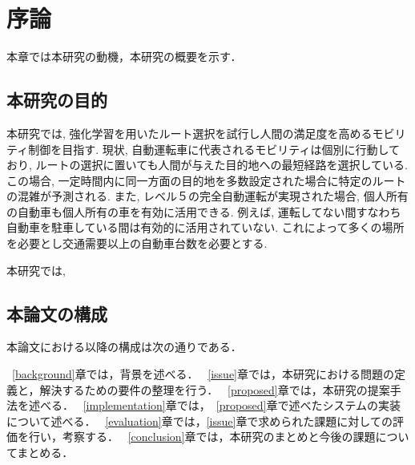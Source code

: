 \chapter{序論}
\label{introduction}

本章では本研究の動機，本研究の概要を示す．

\section{本研究の目的}

本研究では, 強化学習を用いたルート選択を試行し人間の満足度を高めるモビリティ制御を目指す.
現状, 自動運転車に代表されるモビリティは個別に行動しており, ルートの選択に置いても人間が与えた目的地への最短経路を選択している.
この場合, 一定時間内に同一方面の目的地を多数設定された場合に特定のルートの混雑が予測される. 
また, レベル５の完全自動運転が実現された場合, 個人所有の自動車も個人所有の車を有効に活用できる.
例えば, 運転してない間すなわち自動車を駐車している間は有効的に活用されていない. これによって多くの場所を必要とし交通需要以上の自動車台数を必要とする.

本研究では, 



\section{本論文の構成}

本論文における以降の構成は次の通りである．

~\ref{background}章では，背景を述べる．
~\ref{issue}章では，本研究における問題の定義と，解決するための要件の整理を行う．
~\ref{proposed}章では，本研究の提案手法を述べる．
~\ref{implementation}章では，~\ref{proposed}章で述べたシステムの実装について述べる．
~\ref{evaluation}章では，\ref{issue}章で求められた課題に対しての評価を行い，考察する．
~\ref{conclusion}章では，本研究のまとめと今後の課題についてまとめる．


